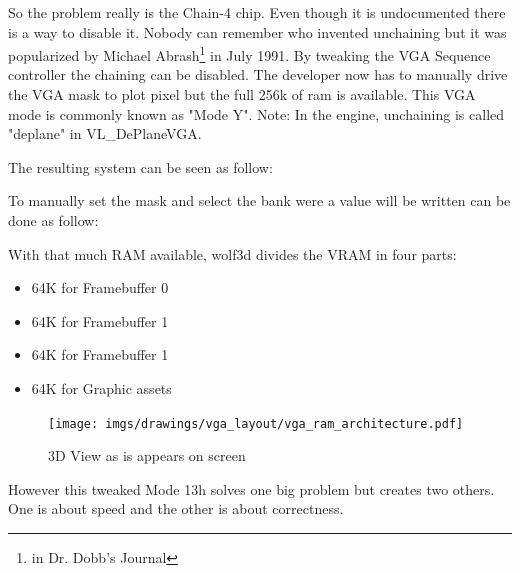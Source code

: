 \documentclass[book.tex]{subfiles}
\begin{document}
 \par
 So the problem really is the Chain-4 chip. Even though it is undocumented there is a way to disable it. Nobody can remember who invented unchaining but it was popularized by Michael Abrash\footnote{in Dr. Dobb's Journal} in July 1991. By tweaking the VGA Sequence controller the chaining can be disabled. The developer now has to manually drive the VGA mask to plot pixel but the full 256k of ram is available. This VGA mode is commonly known as "Mode Y". Note: In the engine, unchaining is called "deplane" in VL\_DePlaneVGA.\\

 \par
  \begin{minipage}{\textwidth}

\end{minipage}
 \par

The resulting system can be seen as follow:\\

 \par
 \begin{minipage}{\textwidth}

\end{minipage}
 \par
 To manually set the mask and select the bank were a value will be written can be done as follow:\\
 \par
 \begin{minipage}{\textwidth}

\end{minipage}
 \par
 With that much RAM available, wolf3d divides the VRAM in four parts:
 \begin{itemize}
 \item 64K for Framebuffer 0
 \item 64K for Framebuffer 1
 \item 64K for Framebuffer 1
 \item 64K for Graphic assets
\end{itemize}
\par
\begin{figure}[H]
\centering
 \texttt{[image: imgs/drawings/vga\_layout/vga\_ram\_architecture.pdf]}
 \caption{3D View as is appears on screen} \label{fig:vga_layout_in_3D}
 \end{figure}
\par
However this tweaked Mode 13h solves one big problem but creates two others. One is about speed and the other is about correctness.\\
\par
\end{document}
